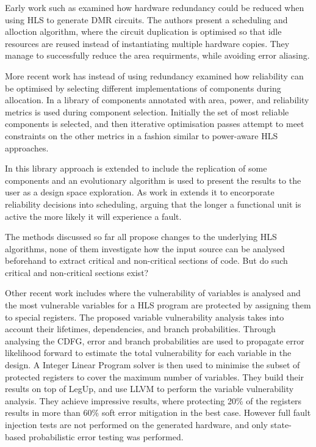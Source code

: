 Early work such as \cite{antola1998high} examined how hardware redundancy 
could be reduced when using HLS to generate DMR circuits.
The authors present a scheduling and alloction algorithm, where the circuit duplication is optimised
so that idle resources are reused instead of instantiating multiple hardware copies.
They manage to successfully reduce the area requirments, while avoiding error aliasing.

More recent work has instead of using redundancy examined how reliability can be optimised by 
selecting different implementations of components during allocation.
In \cite{tosun2005reliability}
a library of components annotated with area, power, and reliability metrics is used during component selection.    
Initially the set of most reliable components is selected, and then itterative optimisation passes attempt to
meet constraints on the other metrics in a fashion similar to power-aware HLS approaches. 

In \cite{glass2007interactive} this library approach is extended to include the replication of some components 
and an evolutionary algorithm is used to present the results to the user as a design space exploration.
As work in \cite{hara2013cost} extends it to encorporate reliability decisions into scheduling, arguing that
the longer a functional unit is active the more likely it will experience a fault. 

The methods discussed so far all propose changes to the underlying HLS algorithms,
none of them  investigate how the input source can be analysed beforehand to extract
critical and non-critical sections of code.
But do such critical and non-critical sections exist?

Other recent work includes \cite{chen2014reliability} where the vulnerability of variables is analysed and the most vulnerable
variables for a HLS program are protected by assigning them to special registers.
The proposed variable vulnerability analysis takes into account their lifetimes, dependencies, and branch probabilities.
Through analysing the CDFG, error and branch probabilities are used to propagate error likelihood forward to estimate the total
vulnerability for each variable in the design.
A Integer Linear Program solver is then used to minimise the subset of protected registers to cover the maximum number of variables.
They build their results on top of LegUp, and use LLVM to perform the variable vulnerability analysis.
They achieve impressive results, where protecting 20\% of the registers results in more than 60\% soft error mitigation in the best case.
However full fault injection tests are not performed on the generated hardware, and only state-based probabilistic error testing
was performed.\\

